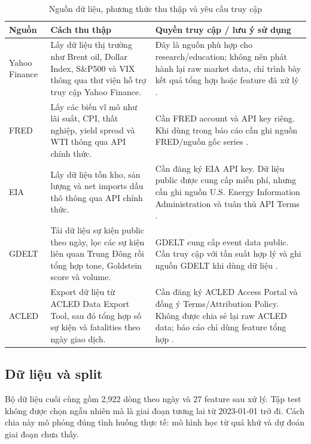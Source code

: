 \documentclass[10pt,a4paper]{article}
\begin{document}
\begin{table}[!htbp]
\centering
\caption{Nguồn dữ liệu, phương thức thu thập và yêu cầu truy cập}
\scriptsize
\begin{tabularx}{\linewidth}{lY Y}
\toprule
\textbf{Nguồn} & \textbf{Cách thu thập} & \textbf{Quyền truy cập / lưu ý sử dụng} \\
\midrule
Yahoo Finance & Lấy dữ liệu thị trường như Brent oil, Dollar Index, S\&P500 và VIX thông qua thư viện hỗ trợ truy cập Yahoo Finance. & Đây là nguồn phù hợp cho research/education; không nên phát hành lại raw market data, chỉ trình bày kết quả tổng hợp hoặc feature đã xử lý \cite{yahooYfinance}. \\
FRED & Lấy các biến vĩ mô như lãi suất, CPI, thất nghiệp, yield spread và WTI thông qua API chính thức. & Cần FRED account và API key riêng. Khi dùng trong báo cáo cần ghi nguồn FRED/nguồn gốc series \cite{fredApi}. \\
EIA & Lấy dữ liệu tồn kho, sản lượng và net imports dầu thô thông qua API chính thức. & Cần đăng ký EIA API key. Dữ liệu public được cung cấp miễn phí, nhưng cần ghi nguồn U.S. Energy Information Administration và tuân thủ API Terms \cite{eiaApi}. \\
GDELT & Tải dữ liệu sự kiện public theo ngày, lọc các sự kiện liên quan Trung Đông rồi tổng hợp tone, Goldstein score và volume. & GDELT cung cấp event data public. Cần truy cập với tần suất hợp lý và ghi nguồn GDELT khi dùng dữ liệu \cite{gdeltData}. \\
ACLED & Export dữ liệu từ ACLED Data Export Tool, sau đó tổng hợp số sự kiện và fatalities theo ngày giao dịch. & Cần đăng ký ACLED Access Portal và đồng ý Terms/Attribution Policy. Không được chia sẻ lại raw ACLED data; báo cáo chỉ dùng feature tổng hợp \cite{acledTerms}. \\
\bottomrule
\end{tabularx}
\end{table}

\subsection{Dữ liệu và split}

Bộ dữ liệu cuối cùng gồm 2,922 dòng theo ngày và 27 feature sau xử lý. Tập test không được chọn ngẫu nhiên mà là giai đoạn tương lai từ 2023-01-01 trở đi. Cách chia này mô phỏng đúng tình huống thực tế: mô hình học từ quá khứ và dự đoán giai đoạn chưa thấy.
\end{document}
